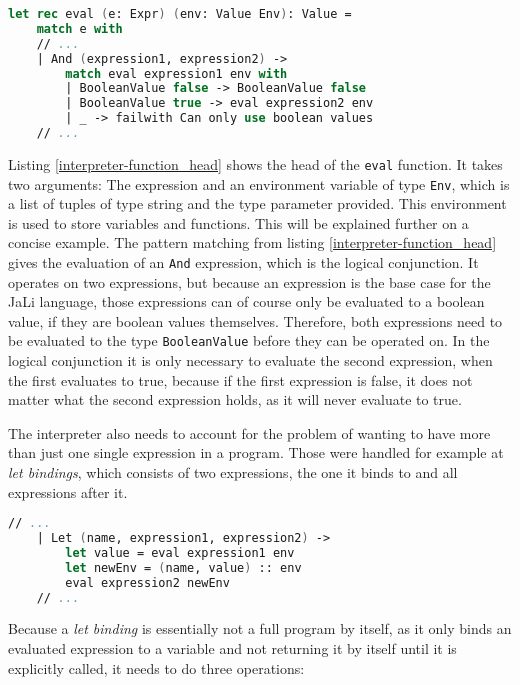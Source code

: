 \begin{lstlisting}[columns=fullflexible, label={interpreter-function_head}, language=FSharp, caption={Function head of \texttt{eval} function in interpreter}]
let rec eval (e: Expr) (env: Value Env): Value =
    match e with
    // ...
    | And (expression1, expression2) ->
        match eval expression1 env with
        | BooleanValue false -> BooleanValue false
        | BooleanValue true -> eval expression2 env
        | _ -> failwith Can only use boolean values
    // ...
\end{lstlisting}

Listing \ref{interpreter-function_head} shows the head of the \texttt{eval} function. It takes two arguments: The expression and an environment variable of type \texttt{Env}, which is a list of tuples of type string and the type parameter provided.
This environment is used to store variables and functions. This will be explained further on a concise example.
The pattern matching from listing \ref{interpreter-function_head} gives the evaluation of an \texttt{And} expression, which is the logical conjunction.
It operates on two expressions, but because an expression is the base case for the JaLi language, those expressions can of course only be evaluated to a boolean value, if they are boolean values themselves. Therefore, both expressions need to be evaluated to the type \texttt{BooleanValue} before they can be operated on. In the logical conjunction it is only necessary to evaluate the second expression, when the first evaluates to true, because if the first expression is false, it does not matter what the second expression holds, as it will never evaluate to true.

The interpreter also needs to account for the problem of wanting to have more than just one single expression in a program. Those were handled for example at \textit{let bindings}, which consists of two expressions, the one it binds to and all expressions after it.

\begin{lstlisting}[columns=fullflexible, label={interpreter-let_binding}, language=FSharp, caption={Evaluation of let bindings}]
    // ...
    | Let (name, expression1, expression2) ->
        let value = eval expression1 env
        let newEnv = (name, value) :: env
        eval expression2 newEnv
    // ...
\end{lstlisting}

Because a \textit{let binding} is essentially not a full program by itself, as it only binds an evaluated expression to a variable and not returning it by itself until it is explicitly called, it needs to do three operations:

